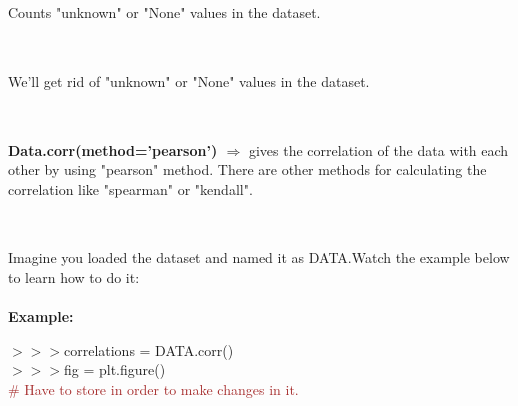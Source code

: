 \documentclass[a4paper,18pt]{article}
\begin{document}
\subsection{\colorbox {matgreen}{\color{white}{\large Data.isna().sum()}}}
Counts "unknown" or "None" values in the dataset.\\\\


\subsection{\colorbox {matgreen}{\color{white}{\large Data.dropna()}}}
We'll get rid of "unknown" or "None" values in the dataset.\\\\


\subsection{\colorbox {matgreen}{\color{white}{\large Data.corr(method='pearson')}}}
\textbf{ Data.corr(method='pearson') $\Rightarrow$} gives the correlation of the data with each other by using "pearson" method. There are other methods for calculating the correlation like "spearman" or "kendall". \\\\


\subsection{\colorbox {matgreen}{\color{white}{\large Plotting Correlation Graph}}}
Imagine you loaded the dataset and named it as DATA.Watch the example below to learn how to do it:\\\\
\textbf{Example:\\}

$>>>$correlations = DATA.corr()\\

$>>>$fig = plt.figure()\\{\textcolor{brown}{\# Have to store in order to make changes in it.}}\\
\end{document}
